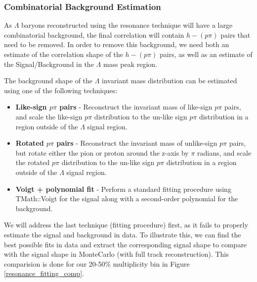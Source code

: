 \documentclass[ALICE,manyauthors]{ALICE_analysis_notes}
\begin{document}
\subsubsection{Combinatorial Background Estimation}
\label{combinatorial_background}

As $\Lambda$ baryons reconstructed using the resonance technique will have a large combinatorial background, the final correlation will contain $h-(p\pi)$ pairs that need to be removed. In order to remove this background, we need both an estimate of the correlation shape of the $h-(p\pi)$ pairs, as well as an estimate of the Signal/Background in the $\Lambda$ mass peak region.

 The background shape of the $\Lambda$ invariant mass distribution can be estimated using one of the following techniques:

 \begin{itemize}
	\item \textbf{Like-sign $p\pi$ pairs} - Reconstruct the invariant mass of like-sign $p\pi$ pairs, and scale the like-sign $p\pi$ distribution to the un-like sign $p\pi$ distribution in a region outside of the $\Lambda$ signal region.
	\item \textbf{Rotated $p\pi$ pairs} - Reconstruct the invariant mass of unlike-sign $p\pi$ pairs, but rotate either the pion or proton around the z-axis by $\pi$ radians, and scale the rotated $p\pi$ distribution to the un-like sign $p\pi$ distribution in a region outside of the $\Lambda$ signal region.
	\item \textbf{Voigt + polynomial fit} - Perform a standard fitting procedure using TMath::Voigt for the signal along with a second-order polynomial for the background.
 \end{itemize}

We will address the last technique (fitting procedure) first, as it fails to properly estimate the signal and background in data. To illustrate this, we can find the best possible fits in data and extract the corresponding signal shape to compare with the signal shape in MonteCarlo (with full track reconstruction). This comparision is done for our 20-50\% multiplicity bin in Figure \ref{resonance_fitting_comp}.
\end{document}
